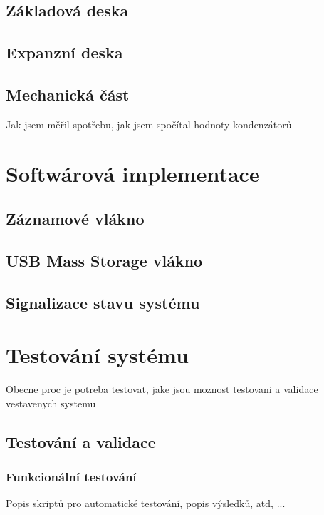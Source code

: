 \section{Základová deska}
\section{Expanzní deska}

\section{Mechanická část}
Jak jsem měřil spotřebu, jak jsem spočítal hodnoty kondenzátorů

\chapter{Softwárová implementace}

\section{Záznamové vlákno}

\section{USB Mass Storage vlákno}

\section{Signalizace stavu systému}

\chapter{Testování systému}
Obecne proc je potreba testovat, jake jsou moznost testovani a validace vestavenych systemu


\section{Testování a validace}

\subsection{Funkcionální testování}
Popis skriptů pro automatické testování, popis výsledků, atd, ...

